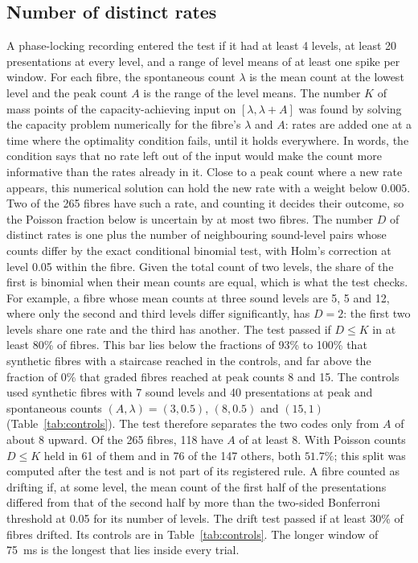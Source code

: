\documentclass[10pt,letterpaper]{article}
\begin{document}
\subsection{Number of distinct rates}
A phase-locking recording entered the test if it had at least 4 levels, at least 20 presentations at every level, and a range of level
means of at least one spike per window. For each fibre, the spontaneous count $\lambda$ is the mean count at the lowest level and the
peak count $A$ is the range of the level means. The number $K$ of mass points of the capacity-achieving input on $[\lambda,\lambda+A]$
was found by solving the capacity problem numerically for the fibre's $\lambda$ and $A$: rates are added one at a time where the
optimality condition fails, until it holds everywhere. In words, the condition says that no rate left out of the input would make the
count more informative than the rates already in it. Close to a peak count where a new rate appears, this numerical
solution can hold the new rate with a weight below $0.005$. Two of the 265 fibres have such a rate, and counting it decides their
outcome, so the Poisson fraction below is uncertain by at most two fibres. The number $D$ of distinct rates is one plus the number of neighbouring
sound-level pairs whose counts differ by the exact conditional binomial test, with Holm's correction at level 0.05 within the fibre. Given the total count of two levels, the share of the first is binomial when
their mean counts are equal, which is what the test checks. For example, a fibre whose mean counts at three sound levels are 5, 5 and 12, where only the second
and third levels differ significantly, has $D=2$: the first two levels share one rate and the third has another. The test passed if $D\le K$ in at least 80\% of fibres. This bar lies below the fractions of 93\% to 100\% that synthetic
fibres with a staircase reached in the controls, and far above the fraction of 0\% that graded fibres reached at peak counts 8 and 15. The controls used synthetic fibres with 7 sound levels and 40 presentations at peak and spontaneous counts
$(A,\lambda)=(3,0.5)$, $(8,0.5)$ and $(15,1)$ (Table~\ref{tab:controls}). The test therefore separates the two codes only from $A$ of about 8 upward. Of the 265
fibres, 118 have $A$ of at least 8. With Poisson counts $D\le K$ held in 61 of them and in 76 of the 147 others, both $51.7\%$;
this split was computed after the test and is not part of its registered rule. A fibre counted as drifting if, at some level, the mean count of the first half
of the presentations differed from that of the second half by more than the two-sided Bonferroni threshold at 0.05 for its number of
levels. The drift test passed if at least 30\% of fibres drifted. Its controls are in Table~\ref{tab:controls}. The longer window of 75~ms is the longest that lies inside every trial.
\end{document}
